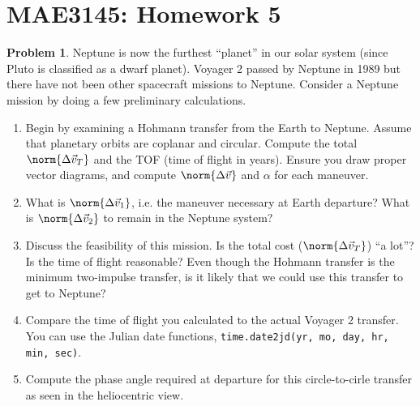 \documentclass[10pt]{article}
\date{}
\theoremstyle{definition}
\newtheorem{prob}{Problem}[section]
\newenvironment{subprob}%
{\renewcommand{\theenumi}{\alph{enumi}}\renewcommand{\labelenumi}{(\theenumi)}\begin{enumerate}}%
{\end{enumerate}}%
\begin{document}
\setcounter{page}{1}
\pagestyle{plain}
\section*{MAE3145: Homework 5}
\vspace*{-0.4cm}

\begin{prob}
    Neptune is now the furthest ``planet'' in our solar system (since Pluto is classified as a dwarf planet).
    Voyager 2 passed by Neptune in 1989 but there have not been other spacecraft missions to Neptune.
    Consider a Neptune mission by doing a few preliminary calculations. 

    \begin{subprob}
        \item Begin by examining a Hohmann transfer from the Earth to Neptune.
        Assume that planetary orbits are coplanar and circular.
        Compute the total \( \norm{\Delta \vec v_T} \) and the TOF (time of flight in years).
        Ensure you draw proper vector diagrams, and compute \( \norm{\Delta \vec v}\) and \( \alpha \) for each maneuver.
    \item What is \( \norm{\Delta \vec v_1} \), i.e. the maneuver necessary at Earth departure?
        What is \( \norm{\Delta \vec v_2}\) to remain in the Neptune system?
    \item Discuss the feasibility of this mission.
        Is the total cost (\( \norm{\Delta \vec v_T}\)) ``a lot''?
        Is the time of flight reasonable?
        Even though the Hohmann transfer is the minimum two-impulse transfer, is it likely that we could use this transfer to get to Neptune?
    \item Compare the time of flight you calculated to the actual Voyager 2 transfer. 
        You can use the Julian date functions, \texttt{time.date2jd(yr, mo, day, hr, min, sec)}.
    \item Compute the phase angle required at departure for this circle-to-cirle transfer as seen in the heliocentric view.
    \end{subprob}


\end{prob}
\end{document}
